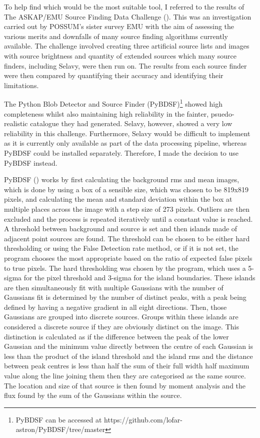 To help find which would be the most suitable tool, I referred to the results of The ASKAP/EMU Source Finding Data Challenge (\cite{data_challenge}). This was an investigation carried out by POSSUM's sister survey EMU with the aim of assessing the various merits and downfalls of many source finding algorithms currently available. The challenge involved creating three artificial source lists and images with source brightness and quantity of extended sources which many source finders, including Selavy, were then run on. The results from each source finder were then compared by quantifying their accuracy and identifying their limitations. 

The Python Blob Detector and Source Finder (PyBDSF)\footnote{PyBDSF can be accessed at https://github.com/lofar-astron/PyBDSF/tree/master} showed high completeness whilst also maintaining high reliability in the fainter, psuedo-realistic catalogue they had generated. Selavy, however, showed a very low reliability in this challenge. Furthermore, Selavy would be difficult to implement as it is currently only available as part of the data processing pipeline, whereas PyBDSF could be installed separately. Therefore, I made the decision to use PyBDSF instead.

PyBDSF (\cite{PyBDSF}) works by first calculating the background rms and mean images, which is done by using a box of a sensible size, which was chosen to be 819x819 pixels, and calculating the mean and standard deviation within the box at multiple places across the image with a step size of 273 pixels. Outliers are then excluded and the process is repeated iteratively until a constant value is reached. A threshold between background and source is set and then islands made of adjacent point sources are found. The threshold can be chosen to be either hard thresholding or using the False Detection rate method, or if it is not set, the program chooses the most appropriate based on the ratio of expected false pixels to true pixels. The hard thresholding was chosen by the program, which uses a 5-sigma for the pixel threshold and 3-sigma for the island boundaries. These islands are then simultaneously fit with multiple Gaussians with the number of Gaussians fit is determined by the number of distinct peaks, with a peak being defined by having a negative gradient in all eight directions. Then, those Gaussians are grouped into discrete sources. Groups within these islands are considered a discrete source if they are obviously distinct on the image. This distinction is calculated as if the difference between the peak of the lower Gaussian and the minimum value directly between the centre of each Gaussian is less than the product of the island threshold and the island rms and the distance between peak centres is less than half the sum of their full width half maximum value along the line joining them then they are categorised as the same source. The location and size of that source is then found by moment analysis %
and the flux found by the sum of the Gaussians within the source.

